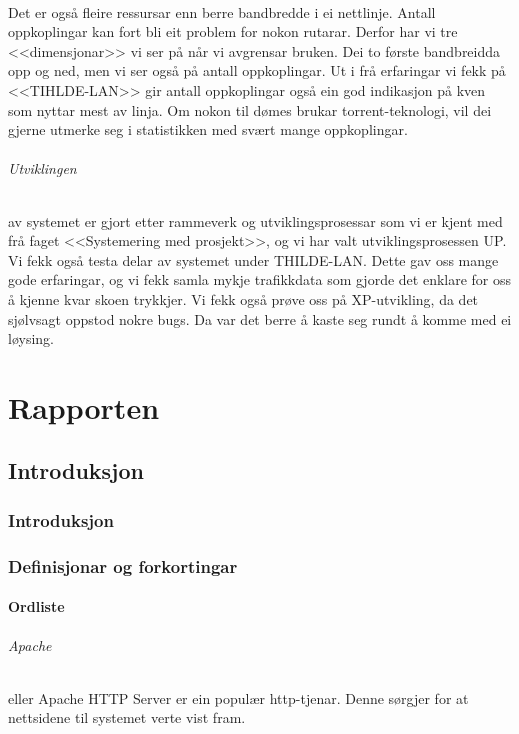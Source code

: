 \documentclass[nynorsk,12pt,a4paper,oneside]{book}
\begin{document}
\paragraph{}Det er også fleire ressursar enn berre bandbredde i ei nettlinje. Antall oppkoplingar kan fort bli eit problem for nokon rutarar. Derfor har vi tre <<dimensjonar>> vi ser på når vi avgrensar bruken. Dei to første bandbreidda opp og ned, men vi ser også på antall oppkoplingar. Ut i frå erfaringar vi fekk på <<TIHLDE-LAN>> gir antall oppkoplingar også ein god indikasjon på kven som nyttar mest av linja. Om nokon til dømes brukar torrent-teknologi, vil dei gjerne utmerke seg i statistikken med svært mange oppkoplingar. 

\paragraph{Utviklingen} av systemet er gjort etter rammeverk og utviklingsprosessar som vi er kjent med frå faget <<Systemering med prosjekt>>, og vi har valt utviklingsprosessen UP. Vi fekk også testa delar av systemet under THILDE-LAN. Dette gav oss mange gode erfaringar, og vi fekk samla mykje trafikkdata som gjorde det enklare for oss å kjenne kvar skoen trykkjer. Vi fekk også prøve oss på XP-utvikling, da det sjølvsagt oppstod nokre bugs. Da var det berre å kaste seg rundt å komme med ei løysing. 

\tableofcontents
\mainmatter
\part{Rapporten}
\chapter{Introduksjon}
\section{Introduksjon}

\section{Definisjonar og forkortingar}
\subsection{Ordliste}
\paragraph{Apache} eller Apache HTTP Server er ein populær http-tjenar. Denne sørgjer for at nettsidene til systemet verte vist fram.
\end{document}
